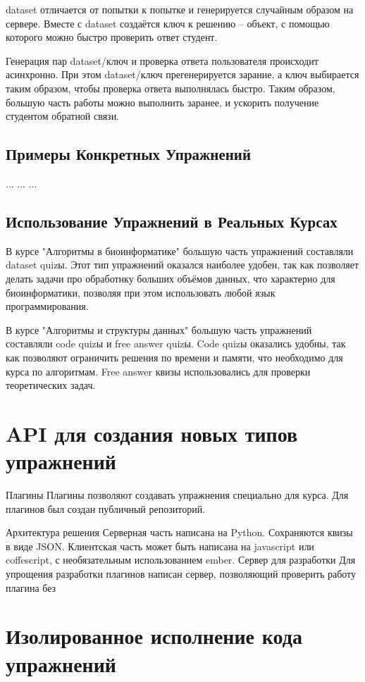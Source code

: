 \documentclass{matmex-diploma-custom}
\begin{document}
dataset отличается от попытки к попытке и генерируется случайным образом на
сервере. Вместе с dataset создаётся ключ к решению -- объект, с помощью
которого можно быстро проверить ответ студент.

Генерация пар dataset/ключ и проверка ответа пользователя происходит
асинхронно. При этом dataset/ключ прегенерируется зарание, а ключ
выбирается таким образом, чтобы проверка ответа выполнялась быстро.
Таким  образом, большую часть работы можно выполнить заранее, и ускорить
получение студентом обратной связи.

\subsection*{Примеры Конкретных Упражнений}
...
...
...

\subsection*{Использование Упражнений в Реальных Курсах}
В курсе "Алгоритмы в биоинформатике" большую часть упражнений
составляли dataset quizы. Этот тип упражнений оказался наиболее
удобен, так как позволяет делать задачи про обработнку больших
объёмов данных, что характерно для биоинформатики, позволяя при
этом использовать любой язык программирования.

В курсе "Алгоритмы и структуры данных" большую часть упражнений
составляли code quizы и free answer quizы. Code quizы оказались
удобны, так как позволяют ограничить решения по времени и памяти,
что необходимо для курса по алгоритмам. Free answer квизы
использовались для проверки теоретических задач.

\section{API для создания новых типов упражнений}

Плагины
Плагины позволяют создавать упражнения специально для курса.
Для плагинов был создан публичный репозиторий.

Архитектура решения
Серверная часть написана на Python. Сохраняются квизы в виде JSON.
Клиентская часть может быть написана на javascript или coffescript,
с необязательным использованием ember.
Сервер для разработки
Для упрощения разработки плагинов написан сервер, позволяющий проверить
работу плагина без

\section{Изолированное исполнение кода упражнений}
\end{document}
